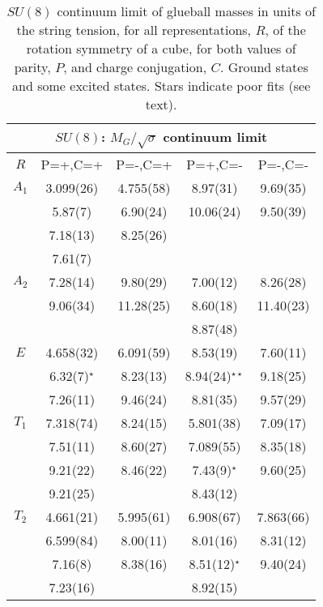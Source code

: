 \documentclass[12pt]{article}
\begin{document}
\clearpage

\begin{table}[htb]
\centering
\begin{tabular}{|c|c|c|c|c|} \hline
\multicolumn{5}{|c|}{$SU(8)$: $M_G/\surd\sigma$  continuum limit} \\ \hline
  $R$   & P=+,C=+ & P=-,C=+ &  P=+,C=-   &  P=-,C=-   \\ \hline
$A_1$  & 3.099(26)  & 4.755(58) & 8.97(31)  & 9.69(35)  \\
    & 5.87(7)    & 6.90(24)  & 10.06(24) & 9.50(39)  \\
    & 7.18(13)   & 8.25(26)  &           &           \\
    & 7.61(7)    &           &           &           \\ \hline
$A_2$  & 7.28(14)   & 9.80(29)  & 7.00(12)  & 8.26(28)  \\
    & 9.06(34)   & 11.28(25) & 8.60(18)  & 11.40(23)  \\
    &            &           & 8.87(48)  &            \\ \hline
$E$   & 4.658(32)  & 6.091(59) & 8.53(19)  & 7.60(11)    \\
    & 6.32(7)$^\star$  & 8.23(13) & 8.94(24)$^{\star\star}$ & 9.18(25)  \\
    & 7.26(11)   & 9.46(24)  & 8.81(35)  & 9.57(29)   \\ \hline
$T_1$  & 7.318(74)  & 8.24(15)  & 5.801(38) & 7.09(17)  \\
    & 7.51(11)   & 8.60(27)  & 7.089(55) & 8.35(18)  \\
    & 9.21(22)   & 8.46(22)  & 7.43(9)$^\star$ & 9.60(25) \\
    & 9.21(25)   &           & 8.43(12)  &   \\ \hline
$T_2$  & 4.661(21)  & 5.995(61) & 6.908(67) & 7.863(66)  \\
    & 6.599(84)  & 8.00(11)  & 8.01(16)  & 8.31(12)  \\
    & 7.16(8)    & 8.38(16)  & 8.51(12)$^\star$ & 9.40(24)  \\
    & 7.23(16)   &           & 8.92(15)  &   \\ \hline
\end{tabular}
\caption{$SU(8)$ continuum limit of glueball masses in units of the string tension,
  for all representations, $R$, of the rotation symmetry of a cube, for
  both values of parity, $P$, and charge conjugation, $C$.
  Ground states and some excited states. Stars
  indicate poor fits (see text).}
\label{table_MK_R_SU8}
\end{table}
\end{document}
